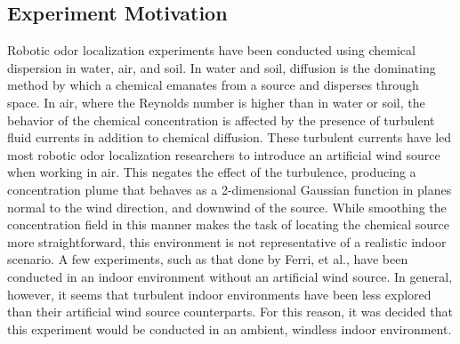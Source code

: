 \documentclass[submit, 12pt]{aiaa-pretty-modified}
\begin{document}
\subsection{Experiment Motivation}
Robotic odor localization experiments have been conducted using chemical
dispersion in water, air, and soil.\cite{kowadlo} In water and soil, diffusion is the
dominating method by which a chemical emanates from a source and disperses
through space. In air, where the Reynolds number is higher than in water or
soil, the behavior of the chemical concentration is affected by the presence of
turbulent fluid currents in addition to chemical diffusion.\cite{kowadlo} These turbulent
currents have led most robotic odor localization researchers to introduce an
artificial wind source when working in air. This negates the effect of the
turbulence, producing a concentration plume that behaves as a 2-dimensional
Gaussian function in planes normal to the wind direction, and downwind of the
source. \cite{ferri} While smoothing the concentration field in this manner makes the task of locating the
chemical source more straightforward, this environment is not representative of
a realistic indoor scenario. A few experiments, such as that done by Ferri, et
al., have been conducted in an indoor environment without an artificial wind
source. \cite{ferri} In general, however, it seems that turbulent indoor environments
have been less explored than their artificial wind source counterparts. For this
reason, it was decided that this experiment would be conducted in an ambient,
windless indoor environment.
\end{document}
